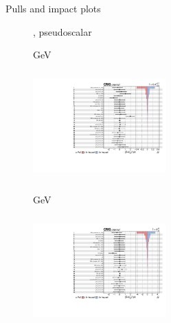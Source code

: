 \documentclass[8pt]{beamer}
\begin{document}
\begin{frame}{Pulls and impact plots}
\justifying
\begin{figure}[htbp]
\centering
\begin{block}{, pseudoscalar}\end{block}	\vspace{-8pt}

\begin{minipage}[b]{0.49\textwidth}
\begin{center}
\centering \begin{block}{ GeV}\end{block}	
\includegraphics[width=5.1cm, height=4.2cm]{figs/impacts_2016_both_pseudo_100.pdf}
\end{center}
\end{minipage}\hfill
\begin{minipage}[b]{0.49\textwidth}
\begin{center}
\centering \begin{block}{ GeV}\end{block}	
\includegraphics[width=5.1cm, height=4.2cm]{figs/impacts_2016_both_pseudo_500.pdf}
\end{center}
\end{minipage} \hfill
\end{figure}
\end{frame}
\end{document}
